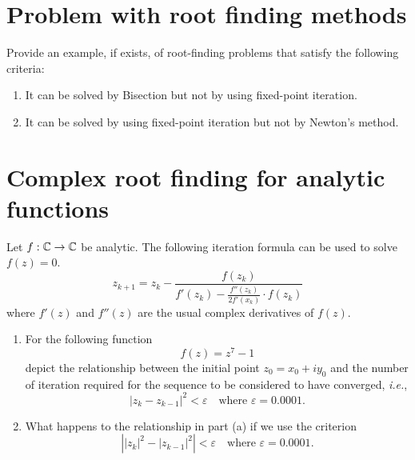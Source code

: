 \section{Problem with root finding methods}
Provide an example, if exists, of root-finding problems that satisfy the following criteria:
\begin{enumerate}
	\item It can be solved by Bisection but not by using fixed-point iteration.
	\item It can be solved by using fixed-point iteration but not by Newton's method.
\end{enumerate}


\section{Complex root finding for analytic functions}
Let \(f:\mathbb{C}\to\mathbb{C}\) be analytic.
The following iteration formula can be used to solve \(f(z)=0\).
\[ z_{k+1}=z_k-\frac{f(z_k)}{f'(z_k)-\frac{f''(z_k)}{2f'(x_k)}\cdot f(z_k)} \]
where \(f'(z)\) and \(f''(z)\) are the usual complex derivatives of \(f(z)\).
\begin{enumerate}
	\item For the following function
	\[ f(z)=z^7-1 \]
	depict the relationship between the initial point \(z_0=x_0+i y_0\) and the number of iteration required for the sequence to be considered to have converged, \textit{i.e.},
	\[ |z_k - z_{k-1}|^2 < \varepsilon \quad \text{where } \varepsilon=0.0001. \]
	\item What happens to the relationship in part (a) if we use the criterion 
	\[ \left| |z_k|^2 - |z_{k-1}|^2\right| < \varepsilon \quad \text{where } \varepsilon=0.0001. \]
\end{enumerate}
